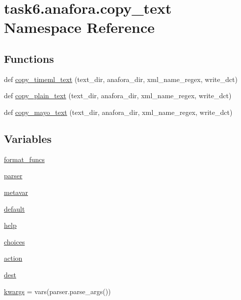 \hypertarget{namespacetask6_1_1anafora_1_1copy__text}{}\section{task6.\+anafora.\+copy\+\_\+text Namespace Reference}
\label{namespacetask6_1_1anafora_1_1copy__text}
\subsection*{Functions}
\begin{DoxyCompactItemize}
\item 
def \hyperlink{namespacetask6_1_1anafora_1_1copy__text_a6fe57006103b6ee9d776d572e3fbda01}{copy\+\_\+timeml\+\_\+text} (text\+\_\+dir, anafora\+\_\+dir, xml\+\_\+name\+\_\+regex, write\+\_\+dct)
\item 
def \hyperlink{namespacetask6_1_1anafora_1_1copy__text_a89b4af8e364ec3955a9821301322312c}{copy\+\_\+plain\+\_\+text} (text\+\_\+dir, anafora\+\_\+dir, xml\+\_\+name\+\_\+regex, write\+\_\+dct)
\item 
def \hyperlink{namespacetask6_1_1anafora_1_1copy__text_abac387851a46c38e5b796d2ceb389bcb}{copy\+\_\+mayo\+\_\+text} (text\+\_\+dir, anafora\+\_\+dir, xml\+\_\+name\+\_\+regex, write\+\_\+dct)
\end{DoxyCompactItemize}
\subsection*{Variables}
\begin{DoxyCompactItemize}
\item 
\hyperlink{namespacetask6_1_1anafora_1_1copy__text_aa033e5a9c53281bafab6f1c66b8c990d}{format\+\_\+funcs}
\item 
\hyperlink{namespacetask6_1_1anafora_1_1copy__text_ab22165cbcec04821811f8b64e35456e9}{parser}
\item 
\hyperlink{namespacetask6_1_1anafora_1_1copy__text_a974d87fb378f0e5377013c2e726d7e12}{metavar}
\item 
\hyperlink{namespacetask6_1_1anafora_1_1copy__text_a6c98320571ec2600e66c2e707ac3f7eb}{default}
\item 
\hyperlink{namespacetask6_1_1anafora_1_1copy__text_a25e70e7961a7989fce6b1f11e320ffde}{help}
\item 
\hyperlink{namespacetask6_1_1anafora_1_1copy__text_af05cb8515132270157ca401c82474a58}{choices}
\item 
\hyperlink{namespacetask6_1_1anafora_1_1copy__text_a42b787bdf94002af72b6e6c0497711a5}{action}
\item 
\hyperlink{namespacetask6_1_1anafora_1_1copy__text_aa0ec833da1e8fb3cc33ee247e69d1ac2}{dest}
\item 
\hyperlink{namespacetask6_1_1anafora_1_1copy__text_a99296eafbdc1b4f5030af611d48bdd7a}{kwargs} = vars(parser.\+parse\+\_\+args())
\end{DoxyCompactItemize}



